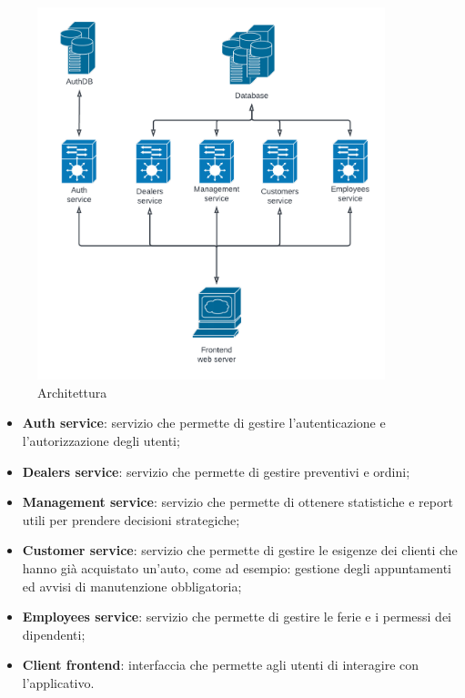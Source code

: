 \documentclass{article}
\begin{document}
  \begin{figure}[h!]
    \centering
    \includegraphics[width=0.9\textwidth]{imgs/arch.png}
    \caption{Architettura}
    \label{fig:arch}
  \end{figure}

  \begin{itemize}
    \item \textbf{Auth service}: servizio che permette di gestire l'autenticazione e 
      l'autorizzazione degli utenti;
    \item \textbf{Dealers service}: servizio che permette di gestire preventivi e ordini;
    \item \textbf{Management service}: servizio che permette di ottenere statistiche e report utili 
      per prendere decisioni strategiche;
    \item \textbf{Customer service}: servizio che permette di gestire le esigenze dei clienti che 
      hanno già acquistato un'auto, come ad esempio: gestione degli appuntamenti ed 
      avvisi di manutenzione obbligatoria;
    \item \textbf{Employees service}: servizio che permette di gestire le ferie e i permessi dei 
      dipendenti;
    \item \textbf{Client frontend}: interfaccia che permette agli utenti di interagire con 
      l'applicativo.
  \end{itemize}
\end{document}
